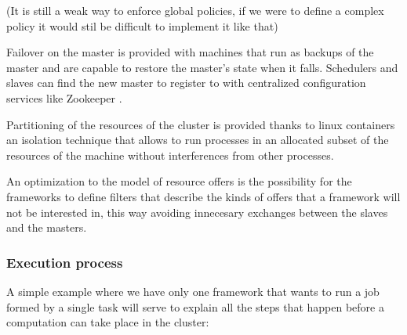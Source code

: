\documentclass{svjour3}                     %
\begin{document}
(It is still a weak way to enforce global policies, if we were to define a complex
policy it would stil be difficult to implement it like that)

Failover on the master is provided with machines that run as backups of the master and
are capable to restore the master's state when it falls. Schedulers and slaves can find
the new master to register to with centralized configuration services like Zookeeper \cite{_apache_????}.

Partitioning of the resources of the cluster is provided thanks to linux containers \cite{_linux_????}
an isolation technique that allows to run processes in an allocated subset of the 
resources of the machine without interferences from other processes. 

An optimization to the model of resource offers is the possibility for the frameworks
to define filters that describe the kinds of offers that a framework will not be interested
in, this way avoiding innecesary exchanges between the slaves and the masters.

\subsubsection{Execution process}

A simple example where we have only one framework that wants to run a 
job formed by a single task will serve to explain all the steps that happen
before a computation can take place in the cluster:
\end{document}
